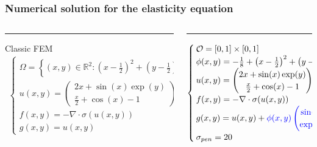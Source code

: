 \begin{frame}
    \frametitle{Numerical solution for the elasticity equation}

    \begin{columns}[T] %
        \begin{column}{.48\textwidth}
        \color{purple}\rule{\linewidth}{4pt}
        Classic FEM \color{black}
        \begin{align*}
            \begin{cases}
            \Omega = \left\{ (x,y)\in\mathbb{R}^2: \left( x-\frac{1}{2} \right)^2 + \left( y-\frac{1}{2} \right)^2 < \frac{1}{8}  \right\} \\
            u(x,y)= \begin{pmatrix}
                2x + \sin(x)\exp(y) \\ \frac{x}{2} + \cos(x) - 1
            \end{pmatrix}  \\
            f(x,y) = -\nabla \cdot \sigma(u(x,y)) \\
            g(x,y) = u(x,y)
            \end{cases}
        \end{align*}
        

        \end{column}%
        \hfill%
        \begin{column}{.48\textwidth}
        \color{orange}\rule{\linewidth}{4pt}
        \phifem \color{black}
        \begin{align*}
            \begin{cases}
            \mathcal{O} = [0,1]\times[0,1] \\
            \phi(x,y) = -\frac{1}{8} + \left( x-\frac{1}{2} \right)^2 + \left( y-\frac{1}{2} \right)^2 \\
            u(x,y)= \begin{pmatrix}
                2x + \sin(x)\exp(y) \\ \frac{x}{2} + \cos(x) - 1
            \end{pmatrix}  \\
            f(x,y) = -\nabla \cdot \sigma(u(x,y)) \\
            g(x,y) = u(x,y) + \textcolor{blue}{\phi(x,y) \begin{pmatrix}
               \sin(x) \\ \exp(y)
            \end{pmatrix}} \\
            \sigma_{pen} = 20
            \end{cases}
        \end{align*}
        


\end{column}
\end{columns}
\end{frame}
